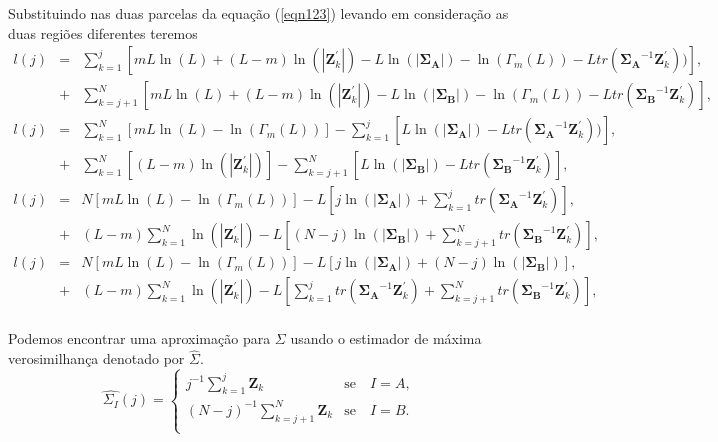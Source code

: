 Substituindo nas duas parcelas da equação (\ref{eqn123}) levando em consideração as duas regiões diferentes teremos
\begin{equation*}
\begin{array}{rcl}
	l(j)&=&\sum_{k=1}^{j}\left[mL\ln{\left(L\right)}+(L-m)\ln{\left(|\mathbf{Z}_{k}^{'}|\right)}- L\ln{\left(|\mathbf{\Sigma_{A}}|\right)}-\ln{\left(\Gamma_m(L)\right)}-L tr(\mathbf{\Sigma_{A}}^{-1}\mathbf{Z}_{k}^{'}))\right], \\
	&+&\sum_{k=j+1}^{N}\left[mL\ln{\left(L\right)}+(L-m)\ln{\left(|\mathbf{Z}_{k}^{'}|\right)}- L\ln{\left(|\mathbf{\Sigma_{B}}|\right)}-\ln{\left(\Gamma_m(L)\right)}-L tr(\mathbf{\Sigma_{B}}^{-1}\mathbf{Z}_{k}^{'})\right], \\
	l(j)&=&\sum_{k=1}^{N}\left[mL\ln{\left(L\right)}-\ln{\left(\Gamma_m(L)\right)}\right]-\sum_{k=1}^{j}\left[ L\ln{\left(|\mathbf{\Sigma_{A}}|\right)}-L tr(\mathbf{\Sigma_{A}}^{-1}\mathbf{Z}_{k}^{'}))\right], \\
	&+&\sum_{k=1}^{N}\left[(L-m)\ln{\left(|\mathbf{Z}_{k}^{'}|\right)}\right]- \sum_{k=j+1}^{N}\left[L\ln{\left(|\mathbf{\Sigma_{B}}|\right)}-L tr(\mathbf{\Sigma_{B}}^{-1}\mathbf{Z}_{k}^{'})\right], \\
	l(j)&=&N\left[mL\ln{\left(L\right)}-\ln{\left(\Gamma_m(L)\right)}\right]-L\left[j\ln{\left(|\mathbf{\Sigma_{A}}|\right)} +\sum_{k=1}^{j}tr(\mathbf{\Sigma_{A}}^{-1}\mathbf{Z}_{k}^{'})\right], \\
	&+&(L-m)\sum_{k=1}^{N}\ln{\left(|\mathbf{Z}_{k}^{'}|\right)}-L\left[(N-j)\ln{\left(|\mathbf{\Sigma_{B}}|\right)}+ \sum_{k=j+1}^{N}tr(\mathbf{\Sigma_{B}}^{-1}\mathbf{Z}_{k}^{'})\right], \\
	l(j)&=&N\left[mL\ln{\left(L\right)}-\ln{\left(\Gamma_m(L)\right)}\right]-L\left[j\ln{\left(|\mathbf{\Sigma_{A}}|\right)} +(N-j)\ln{\left(|\mathbf{\Sigma_{B}}|\right)}\right], \\
	&+&(L-m)\sum_{k=1}^{N}\ln{\left(|\mathbf{Z}_{k}^{'}|\right)}-L\left[\sum_{k=1}^{j}tr(\mathbf{\Sigma_{A}}^{-1}\mathbf{Z}_{k}^{'})+ \sum_{k=j+1}^{N}tr(\mathbf{\Sigma_{B}}^{-1}\mathbf{Z}_{k}^{'})\right], \\
\end{array}
\end{equation*}

Podemos encontrar uma aproximação para $\Sigma$ usando o estimador de máxima verosimilhança denotado por $\widehat{\Sigma}$.
$$
\widehat{\Sigma_{I}}(j) = \left\{
\begin{array}{lc}
	j^{-1}\sum_{k=1}^{j}\mathbf{Z}_{k}  & \mbox{se}\quad I=A,  \\
        (N-j)^{-1}\sum_{k=j+1}^{N}\mathbf{Z}_{k} & \mbox{se}\quad I=B. \\
\end{array}
\right.
$$

